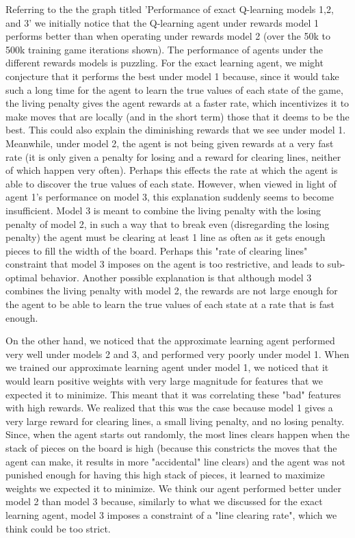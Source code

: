\documentclass[11pt]{article}
\begin{document}
\bigskip

Referring to the the graph titled 'Performance of exact Q-learning models 1,2, and 3' we initially notice that the Q-learning agent under rewards model 1 performs better than when operating under rewards model 2 (over the 50k to 500k training game iterations shown). The performance of agents under the different rewards models is puzzling. For the exact learning agent, we might conjecture that it performs the best under model 1 because, since it would take such a long time for the agent to learn the true values of each state of the game, the living penalty gives the agent rewards at a faster rate, which incentivizes it to make moves that are locally (and in the short term) those that it deems to be the best. This could also explain the diminishing rewards that we see under model 1. Meanwhile, under model 2, the agent is not being given rewards at a very fast rate (it is only given a penalty for losing and a reward for clearing lines, neither of which happen very often). Perhaps this effects the rate at which the agent is able to discover the true values of each state. However, when viewed in light of agent 1's performance on model 3, this explanation suddenly seems to become insufficient. Model 3 is meant to combine the living penalty with the losing penalty of model 2, in such a way that to break even (disregarding the losing penalty) the agent must be clearing at least 1 line as often as it gets enough pieces to fill the width of the board. Perhaps this "rate of clearing lines" constraint that model 3 imposes on the agent is too restrictive, and leads to sub-optimal behavior. Another possible explanation is that although model 3 combines the living penalty with model 2, the rewards are not large enough for the agent to be able to learn the true values of each state at a rate that is fast enough.

\bigskip

On the other hand, we noticed that the approximate learning agent performed very well under models 2 and 3, and performed very poorly under model 1. When we trained our approximate learning agent under model 1, we noticed that it would learn positive weights with very large magnitude for features that we expected it to minimize. This meant that it was correlating these "bad" features with high rewards. We realized that this was the case because model 1 gives a very large reward for clearing lines, a small living penalty, and no losing penalty. Since, when the agent starts out randomly, the most lines clears happen when the stack of pieces on the board is high (because this constricts the moves that the agent can make, it results in more "accidental" line clears) and the agent was not punished enough for having this high stack of pieces, it learned to maximize weights we expected it to minimize. We think our agent performed better under model 2 than model 3 because, similarly to what we discussed for the exact learning agent, model 3 imposes a constraint of a "line clearing rate", which we think could be too strict.
\end{document}
